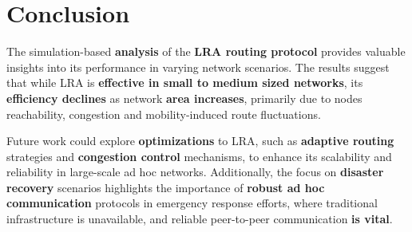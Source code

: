 \documentclass[../report.tex]{subfiles}
\begin{document}
\section{Conclusion}
The simulation-based \textbf{analysis} of the \textbf{LRA routing protocol} provides valuable insights into its performance in varying network scenarios. The results suggest that while LRA is \textbf{effective in small to medium sized networks}, its \textbf{efficiency declines} as network \textbf{area increases}, primarily due to nodes reachability, congestion and mobility-induced route fluctuations. 

Future work could explore \textbf{optimizations} to LRA, such as \textbf{adaptive routing} strategies and \textbf{congestion control} mechanisms, to enhance its scalability and reliability in large-scale ad hoc networks. Additionally, the focus on \textbf{disaster recovery} scenarios highlights the importance of \textbf{robust ad hoc communication} protocols in emergency response efforts, where traditional infrastructure is unavailable, and reliable peer-to-peer communication \textbf{is vital}.
\end{document}

